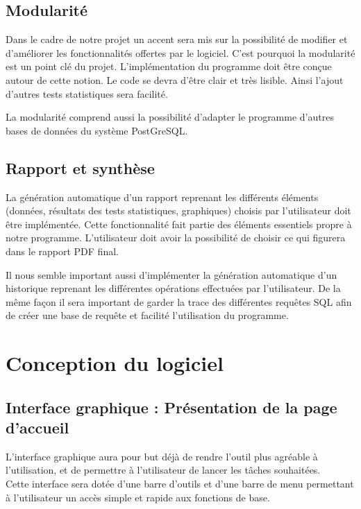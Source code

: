 \documentclass[a4paper,10pt]{report}
\begin{document}
\subsection{Modularité}

Dans le cadre de notre projet un accent sera mis sur la possibilité de modifier et d'améliorer les fonctionnalités offertes par le logiciel. C'est pourquoi la modularité est un point clé du projet. L'implémentation du programme doit être conçue autour de cette notion. Le code se devra d'être clair et très lisible. Ainsi l'ajout d'autres tests statistiques sera facilité. 

La modularité comprend aussi la possibilité d'adapter le programme d'autres bases de données du système PostGreSQL.

\subsection{Rapport et synthèse}

La génération automatique d'un rapport reprenant les différents éléments (données, résultats des tests statistiques, graphiques) choisis par l'utilisateur doit être implémentée. Cette fonctionnalité fait partie des éléments essentiels propre à notre programme. L'utilisateur doit avoir la possibilité de choisir ce qui figurera dans le rapport PDF final.

Il nous semble important aussi d'implémenter la génération automatique d'un historique reprenant les différentes opérations effectuées par l'utilisateur. De la même façon il sera important de garder la trace des différentes requêtes SQL afin de créer une base de requête et facilité l'utilisation du programme.

\section{Conception du logiciel}

\subsection{Interface graphique : Présentation de la page d'accueil}

L'interface graphique aura pour but déjà de rendre l'outil plus agréable à l'utilisation, et de permettre à l'utilisateur de lancer les tâches souhaitées.\\

Cette interface sera dotée d'une barre d'outils et d’une barre de menu permettant à l'utilisateur un accès simple et rapide aux fonctions de base. \\
\end{document}

